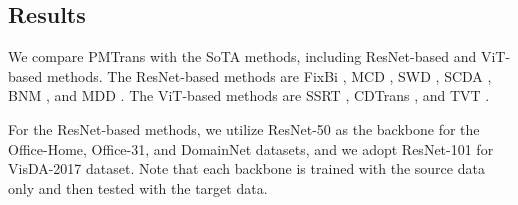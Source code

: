 \documentclass[10pt,twocolumn,letterpaper, ]{article}
\begin{document}
\subsection{Results}

We compare PMTrans with the SoTA methods, including ResNet-based and ViT-based methods. The ResNet-based methods are FixBi \cite{NaJCH21}, MCD \cite{SaitoWUH18}, SWD \cite{LeeBBU19}, SCDA \cite{0008XLLLQL21}, BNM \cite{CuiWZLH020}, and MDD \cite{0002LLJ19}. The ViT-based methods are SSRT \cite{abs-2204-07683}, CDTrans \cite{abs-2109-06165}, and TVT \cite{abs-2108-05988}. 

 For the ResNet-based methods, we utilize ResNet-50 as the backbone for the Office-Home, Office-31, and DomainNet datasets, and we adopt ResNet-101 for VisDA-2017 dataset. Note that each backbone is trained with the source data only and then tested with the target data. 
\end{document}
